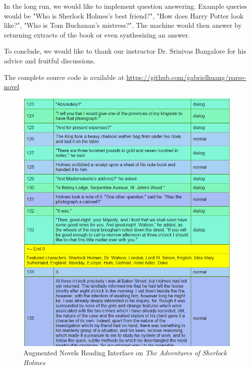 \documentclass[twoside]{article}
\begin{document}
\begin{multicols}{2}
In the long run, we would like to implement question answering. Example queries would be "Who is Sherlock Holmes's best friend?", "How does Harry Potter look like?", "Who is Tom Buchanan's mistress?". The machine would then answer by returning extracts of the book or even synthesizing an answer.

To conclude, we would like to thank our instructor Dr. Srinivas Bangalore for his advice and fruitful discussions.

The complete source code is available at \href{https://github.com/gabrielhuang/parse-novel}{https://github.com/gabrielhuang/parse-novel}






\end{multicols}


\begin{figure}
  \includegraphics[width=\textwidth]{img/interface}
  \caption{Augmented Novels Reading Interface on \emph{The Adventures of Sherlock Holmes}\label{figure:interface}}
\end{figure}
\end{document}
